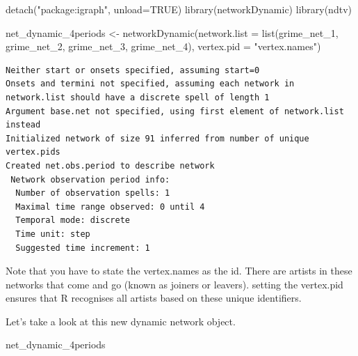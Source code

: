 \documentclass[
  letterpaper,
  DIV=11,
  numbers=noendperiod]{scrreprt}
\newenvironment{Shaded}{\begin{snugshade}}{\end{snugshade}}
\newcommand{\AttributeTok}[1]{\textcolor[rgb]{0.40,0.45,0.13}{#1}}
\newcommand{\ConstantTok}[1]{\textcolor[rgb]{0.56,0.35,0.01}{#1}}
\newcommand{\FunctionTok}[1]{\textcolor[rgb]{0.28,0.35,0.67}{#1}}
\newcommand{\NormalTok}[1]{\textcolor[rgb]{0.00,0.23,0.31}{#1}}
\newcommand{\OtherTok}[1]{\textcolor[rgb]{0.00,0.23,0.31}{#1}}
\newcommand{\StringTok}[1]{\textcolor[rgb]{0.13,0.47,0.30}{#1}}
\begin{document}
\begin{Shaded}
\begin{Highlighting}[]
\FunctionTok{detach}\NormalTok{(}\StringTok{"package:igraph"}\NormalTok{, }\AttributeTok{unload=}\ConstantTok{TRUE}\NormalTok{)}
\FunctionTok{library}\NormalTok{(networkDynamic)}
\FunctionTok{library}\NormalTok{(ndtv)}

\NormalTok{net\_dynamic\_4periods }\OtherTok{\textless{}{-}} \FunctionTok{networkDynamic}\NormalTok{(}\AttributeTok{network.list =} \FunctionTok{list}\NormalTok{(grime\_net\_1, }
\NormalTok{                                                           grime\_net\_2, }
\NormalTok{                                                           grime\_net\_3,}
\NormalTok{                                                           grime\_net\_4), }\AttributeTok{vertex.pid =} \StringTok{"vertex.names"}\NormalTok{)}
\end{Highlighting}
\end{Shaded}

\begin{verbatim}
Neither start or onsets specified, assuming start=0
Onsets and termini not specified, assuming each network in network.list should have a discrete spell of length 1
Argument base.net not specified, using first element of network.list instead
Initialized network of size 91 inferred from number of unique vertex.pids
Created net.obs.period to describe network
 Network observation period info:
  Number of observation spells: 1 
  Maximal time range observed: 0 until 4 
  Temporal mode: discrete 
  Time unit: step 
  Suggested time increment: 1 
\end{verbatim}

Note that you have to state the vertex.names as the id. There are
artists in these networks that come and go (known as joiners or
leavers). setting the vertex.pid ensures that R recognises all artists
based on these unique identifiers.

Let's take a look at this new dynamic network object.

\begin{Shaded}
\begin{Highlighting}[]
\NormalTok{net\_dynamic\_4periods}
\end{Highlighting}
\end{Shaded}
\end{document}
